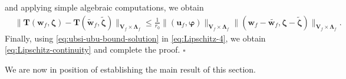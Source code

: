 \documentclass[11pt]{article}
\numberwithin{equation}{section}
\newcommand{\bLambda}{{\boldsymbol\Lambda}}
\newcommand{\bvarphi}{{\boldsymbol\varphi}}
\newcommand{\bzeta}{{\boldsymbol\zeta}}
\newcommand{\bw}{{\mathbf{w}}}
\newcommand{\f}{\mathbf{f}}
\newcommand{\bu}{\mathbf{u}}
\newcommand{\0}{{\mathbf{0}}}
\def\bV{\mathbf{V}}
\def\bT{\mathbf{T}}
\newcommand{\bL}{\mathbf{L}}
\newcommand\bbL{\mathbb{L}}
\def\L{\mathrm{L}}
\def\wt{\widetilde}
\def\wh{\widehat}
\newenvironment{proof}{\noindent{\it Proof.}}{\hfill$\square$}
\numberwithin{equation}{section}
\begin{document}
\begin{proof}
and applying simple algebraic computations, we obtain
\begin{align}
&\|\bT(\bw_f,\bzeta) - \bT(\wt{\bw}_f,\wt{\bzeta}) \|_{\bV_f\times \bLambda_f} \leq \frac{1}{r_0}\|(\bu_f,\bvarphi)\|_{\bV_f\times\bLambda_f}\|(\bw_f-\wt{\bw_f},\bzeta-\wt{\bzeta})\|_{\bV_f\times \bLambda_f}.\label{eq:Lipschitz-4}
\end{align}
Finally, using \eqref{eq:ubsi-ubu-bound-solution} in \eqref{eq:Lipschitz-4}, we obtain \eqref{eq:Lipschitz-continuity} and complete the proof.
\end{proof}

\medskip

We are now in position of establishing the main result of this section.
\end{document}
